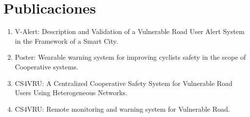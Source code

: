 \section{Publicaciones}
\begin{enumerate}
	\item V-Alert: Description and Validation of a Vulnerable Road User Alert System
	in the Framework of a Smart City. \cite{1}
	
	\item Poster: Wearable warning system for improving cyclists safety in the scope
	of Cooperative systems. \cite{7}
	
	\item CS4VRU: A Centralized Cooperative Safety System for Vulnerable Road Users
	Using Heterogeneous Networks. \cite{8}
	
	\item CS4VRU: Remote monitoring and warning system for Vulnerable Road. \cite{9}
\end{enumerate}